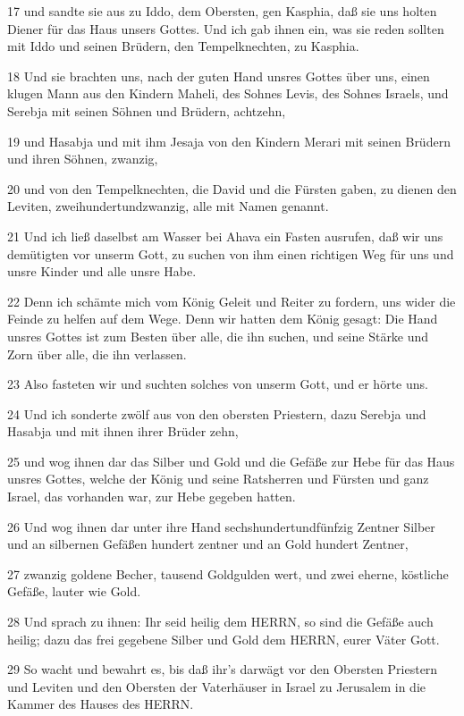 \par 17 und sandte sie aus zu Iddo, dem Obersten, gen Kasphia, daß sie uns holten Diener für das Haus unsers Gottes. Und ich gab ihnen ein, was sie reden sollten mit Iddo und seinen Brüdern, den Tempelknechten, zu Kasphia.
\par 18 Und sie brachten uns, nach der guten Hand unsres Gottes über uns, einen klugen Mann aus den Kindern Maheli, des Sohnes Levis, des Sohnes Israels, und Serebja mit seinen Söhnen und Brüdern, achtzehn,
\par 19 und Hasabja und mit ihm Jesaja von den Kindern Merari mit seinen Brüdern und ihren Söhnen, zwanzig,
\par 20 und von den Tempelknechten, die David und die Fürsten gaben, zu dienen den Leviten, zweihundertundzwanzig, alle mit Namen genannt.
\par 21 Und ich ließ daselbst am Wasser bei Ahava ein Fasten ausrufen, daß wir uns demütigten vor unserm Gott, zu suchen von ihm einen richtigen Weg für uns und unsre Kinder und alle unsre Habe.
\par 22 Denn ich schämte mich vom König Geleit und Reiter zu fordern, uns wider die Feinde zu helfen auf dem Wege. Denn wir hatten dem König gesagt: Die Hand unsres Gottes ist zum Besten über alle, die ihn suchen, und seine Stärke und Zorn über alle, die ihn verlassen.
\par 23 Also fasteten wir und suchten solches von unserm Gott, und er hörte uns.
\par 24 Und ich sonderte zwölf aus von den obersten Priestern, dazu Serebja und Hasabja und mit ihnen ihrer Brüder zehn,
\par 25 und wog ihnen dar das Silber und Gold und die Gefäße zur Hebe für das Haus unsres Gottes, welche der König und seine Ratsherren und Fürsten und ganz Israel, das vorhanden war, zur Hebe gegeben hatten.
\par 26 Und wog ihnen dar unter ihre Hand sechshundertundfünfzig Zentner Silber und an silbernen Gefäßen hundert zentner und an Gold hundert Zentner,
\par 27 zwanzig goldene Becher, tausend Goldgulden wert, und zwei eherne, köstliche Gefäße, lauter wie Gold.
\par 28 Und sprach zu ihnen: Ihr seid heilig dem HERRN, so sind die Gefäße auch heilig; dazu das frei gegebene Silber und Gold dem HERRN, eurer Väter Gott.
\par 29 So wacht und bewahrt es, bis daß ihr's darwägt vor den Obersten Priestern und Leviten und den Obersten der Vaterhäuser in Israel zu Jerusalem in die Kammer des Hauses des HERRN.
